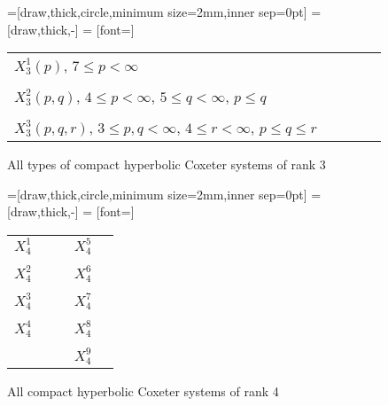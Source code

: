 \begin{figure}
	\centering
	=[draw,thick,circle,minimum size=2mm,inner sep=0pt]
	 = [draw,thick,-]
	 = [font=\small]

	\begin{tabular}{MMcMM}
		$X_3^1(p)$, {\tiny $7 \leq p < \infty$} & \comphyperthreeone \\ \vspace*{\cgpadv} \\
		$X_3^2(p,q)$, {\tiny $4 \leq p < \infty$, $5 \leq q < \infty$, $p \leq q$} & \comphyperthreetwo \\ \vspace*{\cgpadv} \\
		$X_3^3(p,q,r)$, {\tiny $3 \leq p,q < \infty$, $4 \leq r < \infty$, $p \leq q \leq r$} & \comphyperthreethree
	\end{tabular}
	\caption{All types of compact hyperbolic Coxeter systems of rank 3}
	\label{fig:compact-hyperbolic-coxeter-systems-3}
\end{figure}

\begin{figure}
	\centering
	=[draw,thick,circle,minimum size=2mm,inner sep=0pt]
	 = [draw,thick,-]
	 = [font=\small]

	\begin{tabular}{MMcMM}
		$X_4^1$ & \comphyperfourlineone & \hspace*{\cgpadh} & $X_4^5$ & \comphyperfoursquareone \\ \vspace*{\cgpadv} \\
		$X_4^2$ & \comphyperfourlinetwo & \hspace*{\cgpadh} & $X_4^6$ & \comphyperfoursquaretwo \\ \vspace*{\cgpadv} \\
		$X_4^3$ & \comphyperfourlinethree & \hspace*{\cgpadh} & $X_4^7$ & \comphyperfoursquarethree \\ \vspace*{\cgpadv} \\
		$X_4^4$ & \comphyperfourlinefour & \hspace*{\cgpadh} & $X_4^8$ & \comphyperfoursquarefour \\ \vspace*{\cgpadv} \\
		& & & $X_4^9$ & \comphyperfoursquarefive
	\end{tabular}
	\caption{All compact hyperbolic Coxeter systems of rank 4}
	\label{fig:compact-hyperbolic-coxeter-systems-4}
\end{figure}

